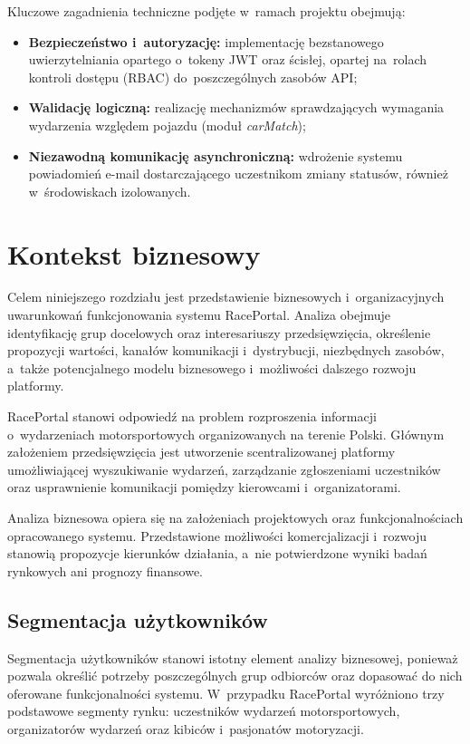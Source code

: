 \documentclass{sprz}
\begin{document}
Kluczowe zagadnienia techniczne podjęte w~ramach projektu obejmują:
\begin{itemize}
  \item \textbf{Bezpieczeństwo i~autoryzację:} implementację bezstanowego uwierzytelniania opartego o~tokeny JWT oraz ścisłej, opartej na~rolach kontroli dostępu (RBAC) do~poszczególnych zasobów API;
  \item \textbf{Walidację logiczną:} realizację mechanizmów sprawdzających wymagania wydarzenia względem pojazdu (moduł \emph{carMatch});
  \item \textbf{Niezawodną komunikację asynchroniczną:} wdrożenie systemu powiadomień e-mail dostarczającego uczestnikom zmiany statusów, również w~środowiskach izolowanych.
\end{itemize}

\chapter{Kontekst biznesowy}
\label{ch:biznes}
Celem niniejszego rozdziału jest przedstawienie biznesowych i~organizacyjnych uwarunkowań funkcjonowania systemu RacePortal. Analiza obejmuje identyfikację grup docelowych oraz interesariuszy przedsięwzięcia, określenie propozycji wartości, kanałów komunikacji i~dystrybucji, niezbędnych zasobów, a~także potencjalnego modelu biznesowego i~możliwości dalszego rozwoju platformy.

RacePortal stanowi odpowiedź na problem rozproszenia informacji o~wydarzeniach motorsportowych organizowanych na terenie Polski. Głównym założeniem przedsięwzięcia jest utworzenie scentralizowanej platformy umożliwiającej wyszukiwanie wydarzeń, zarządzanie zgłoszeniami uczestników oraz usprawnienie komunikacji pomiędzy kierowcami i~organizatorami.

Analiza biznesowa opiera się na założeniach projektowych oraz funkcjonalnościach opracowanego systemu. Przedstawione możliwości komercjalizacji i~rozwoju stanowią propozycje kierunków działania, a~nie potwierdzone wyniki badań rynkowych ani prognozy finansowe.

\section{Segmentacja użytkowników}
\label{sec:segmentacja}
Segmentacja użytkowników stanowi istotny element analizy biznesowej, ponieważ pozwala określić potrzeby poszczególnych grup odbiorców oraz dopasować do nich oferowane funkcjonalności systemu. W~przypadku RacePortal wyróżniono trzy podstawowe segmenty rynku: uczestników wydarzeń motorsportowych, organizatorów wydarzeń oraz kibiców i~pasjonatów motoryzacji.
\end{document}
